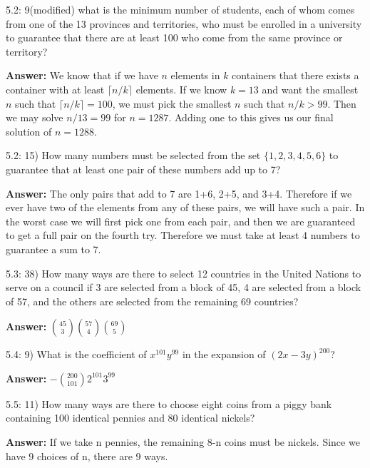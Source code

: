 \documentclass{article}
\newenvironment{answer}
{\color{PineGreen}\begin{list}{}%
         {\setlength{\leftmargin}{1cm}}%
         \item[]%
        \textbf{Answer: }}
{\end{list}}
\begin{document}
5.2: 9(modified) what is the minimum number of students, each of whom
comes from one of the 13 provinces and territories, who must be
enrolled in a university to guarantee that there are at least 100 who
come from the same province or territory?

\begin{answer}We know that if we have $n$ elements in $k$ containers that there exists a container with at least $\lceil n/k \rceil$ elements. If we know $k=13$ and want the smallest $n$ such that $\lceil n/k \rceil = 100$, we must pick the smallest $n$ such that $n/k>99$. Then we may solve $n/13 = 99$ for $n=1287$. Adding one to this gives us our final solution of $n=1288$. \end{answer}

5.2: 15) How many numbers must be selected from the set
$\{1,2,3,4,5,6\}$ to guarantee that at least one pair of these numbers
add up to 7?

\begin{answer}The only pairs that add to 7 are 1+6, 2+5, and 3+4. Therefore if we ever have two of the elements from any of these pairs, we will have such a pair. In the worst case we will first pick one from each pair, and then we are guaranteed to get a full pair on the fourth try. Therefore we must take at least 4 numbers to guarantee a sum to 7.\end{answer}

5.3: 38) How many ways are there to select 12 countries in the United
Nations to serve on a council if 3 are selected from a block of 45, 4
are selected from a block of 57, and the others are selected from the
remaining 69 countries?

\begin{answer}${45 \choose 3}{57 \choose 4}{69 \choose 5}$\end{answer}

5.4: 9) What is the coefficient of $x^{101}y^{99}$ in the expansion of
$(2x-3y)^{200}$?

\begin{answer}$-{200 \choose 101}2^{101} 3^{99}$\end{answer}

5.5: 11) How many ways are there to choose eight coins from a piggy
bank containing 100 identical pennies and 80 identical nickels?
\begin{answer}If we take n pennies, the remaining 8-n coins must be nickels. Since we have 9 choices of n, there are 9 ways.\end{answer}
\end{document}
